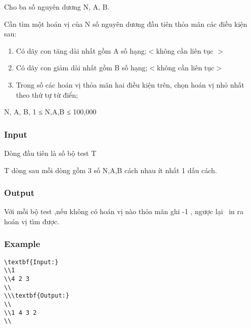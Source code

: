 



   Cho ba số nguyên dương N, A, B.  

   Cần tìm một hoán vị của N số nguyên dương đầu tiên thỏa mãn các điều kiện sau:  
\begin{enumerate}
	\item     Có dãy con tăng dài nhất gồm A số hạng;$<$không cần liên tục $>$   
	\item     Có dãy con giảm dài nhất gồm B số hạng;$<$không cần liên tục$>$   
	\item     Trong số các hoán vị thỏa mãn hai điều kiện trên, chọn hoán vị nhỏ nhất theo thứ tự từ điển;   
\end{enumerate}

   N, A, B, 1 ≤ N,A,B ≤ 100,000  

\subsubsection{   Input  }

   Dòng đầu tiên là số bộ test T  

   T dòng sau mỗi dòng gồm 3 số N,A,B cách nhau ít nhất 1 dấu cách.  

\subsubsection{   Output  }

   Với mỗi bộ test ,nếu không có hoán vị nào thỏa mãn ghi -1 , ngược lại  in ra hoán vị tìm được.  

\subsubsection{   Example  }
\begin{verbatim}
\textbf{Input:}
\\1
\\4 2 3
\\
\\\textbf{Output:}
\\
\\1 4 3 2
\\\end{verbatim}